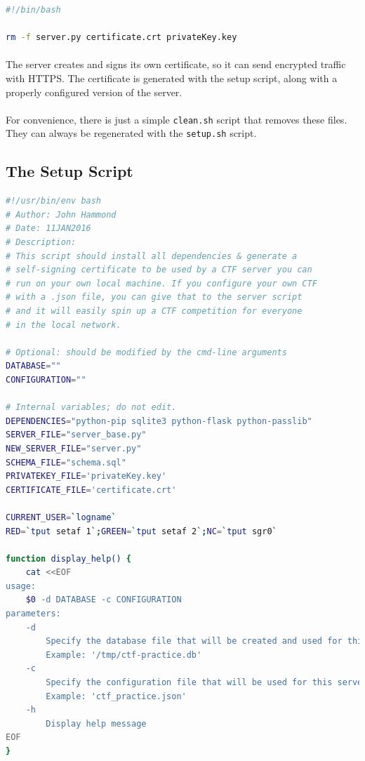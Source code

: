 \documentclass[11pt]{article}
\begin{document}
	\begin{lstlisting}[language=bash]
#!/bin/bash

rm -f server.py certificate.crt privateKey.key
\end{lstlisting}	


	\paragraph{} The server creates and signs its own certificate, so it can send encrypted traffic with HTTPS. The certificate is generated with the setup script, along with a properly configured version of the server. 

	\paragraph{} For convenience, there is just a simple \texttt{clean.sh} script that removes these files. They can always be regenerated with the \texttt{setup.sh} script.


	\newpage

	\subsection{The Setup Script }

	\begin{lstlisting}[language=bash]
#!/usr/bin/env bash
# Author: John Hammond
# Date: 11JAN2016
# Description:
# This script should install all dependencies & generate a 
# self-signing certificate to be used by a CTF server you can 
# run on your own local machine. If you configure your own CTF 
# with a .json file, you can give that to the server script 
# and it will easily spin up a CTF competition for everyone 
# in the local network.

# Optional: should be modified by the cmd-line arguments
DATABASE=""
CONFIGURATION=""

# Internal variables; do not edit.
DEPENDENCIES="python-pip sqlite3 python-flask python-passlib"
SERVER_FILE="server_base.py"
NEW_SERVER_FILE="server.py"
SCHEMA_FILE="schema.sql"
PRIVATEKEY_FILE='privateKey.key'
CERTIFICATE_FILE='certificate.crt'

CURRENT_USER=`logname`
RED=`tput setaf 1`;GREEN=`tput setaf 2`;NC=`tput sgr0`

function display_help() {
	cat <<EOF
usage:
	$0 -d DATABASE -c CONFIGURATION
parameters:
	-d
		Specify the database file that will be created and used for this server.
		Example: '/tmp/ctf-practice.db'
	-c
		Specify the configuration file that will be used for this server.
		Example: 'ctf_practice.json'
	-h
		Display help message
EOF
}
\end{lstlisting}
\end{document}
